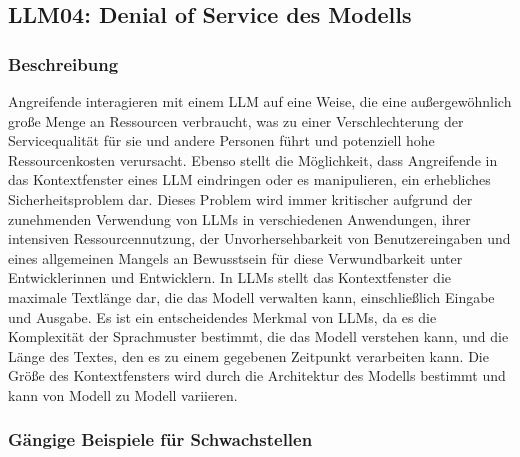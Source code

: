\documentclass[
]{article}
\author{}
\date{}
\begin{document}
\subsection{LLM04: Denial of Service des
Modells}\label{llm04-denial-of-service-des-modells}

\subsubsection{Beschreibung}\label{beschreibung}

Angreifende interagieren mit einem LLM auf eine Weise, die eine
außergewöhnlich große Menge an Ressourcen verbraucht, was zu einer
Verschlechterung der Servicequalität für sie und andere Personen führt
und potenziell hohe Ressourcenkosten verursacht. Ebenso stellt die
Möglichkeit, dass Angreifende in das Kontextfenster eines LLM eindringen
oder es manipulieren, ein erhebliches Sicherheitsproblem dar. Dieses
Problem wird immer kritischer aufgrund der zunehmenden Verwendung von
LLMs in verschiedenen Anwendungen, ihrer intensiven Ressourcennutzung,
der Unvorhersehbarkeit von Benutzereingaben und eines allgemeinen
Mangels an Bewusstsein für diese Verwundbarkeit unter Entwicklerinnen
und Entwicklern. In LLMs stellt das Kontextfenster die maximale
Textlänge dar, die das Modell verwalten kann, einschließlich Eingabe und
Ausgabe. Es ist ein entscheidendes Merkmal von LLMs, da es die
Komplexität der Sprachmuster bestimmt, die das Modell verstehen kann,
und die Länge des Textes, den es zu einem gegebenen Zeitpunkt
verarbeiten kann. Die Größe des Kontextfensters wird durch die
Architektur des Modells bestimmt und kann von Modell zu Modell
variieren.

\subsubsection{Gängige Beispiele für
Schwachstellen}\label{guxe4ngige-beispiele-fuxfcr-schwachstellen}
\end{document}
